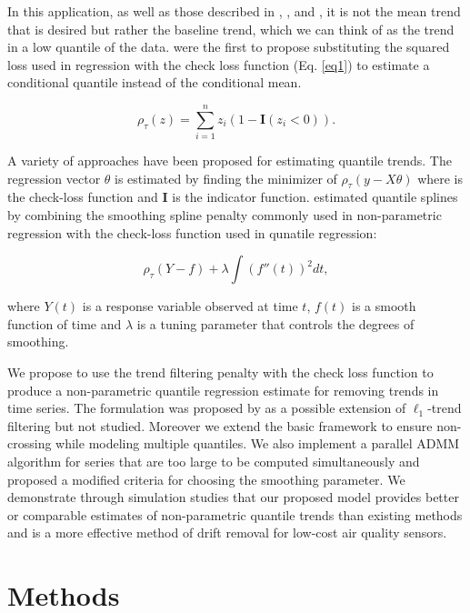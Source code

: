 \documentclass[12pt]{article}
\begin{document}
	
	In this application, as well as those described in \cite{Ning2014}, \cite{marandi2015qualitative}, and \cite{pettersson2013algorithm}, it is not the mean trend that is desired but rather the baseline trend, which we can think of as the trend in a low quantile of the data.  \cite{Koenker1978} were the first to propose substituting the squared loss used in regression with the check loss function  (Eq. \ref{eq1}) to estimate a conditional quantile instead of the conditional mean. 
	
	\begin{equation}
	\label{eq1}
	 \rho_{\tau}(z) = \sum_{i=1}^n z_i(1-\mathbf{I}(z_i<0)).
	\end{equation}
	
	A variety of approaches have been proposed for estimating quantile trends.  The regression vector $\theta$ is estimated by finding the minimizer of $\rho_{\tau}(y-X\theta)$ where is the check-loss function and $\mathbf{I}$ is the indicator function.   \cite{nychka1995nonparametric} estimated quantile splines by combining the smoothing spline penalty commonly used in non-parametric regression with the check-loss function used in qunatile regression:
	
	\begin{equation*}
	\rho_{\tau}(Y - f) + \lambda\int (f''(t))^2 dt, 
 	\end{equation*}
	
	where $Y(t)$ is a response variable observed at time $t$, $f(t)$ is a smooth function of time and $\lambda$ is a tuning parameter that controls the degrees of smoothing. 


	We propose to use the trend filtering penalty with the check loss function to produce a non-parametric quantile regression estimate for removing trends in time series. The formulation was proposed by \cite{Kim2009} as a possible extension of $\ell_1$-trend filtering but not studied. Moreover we extend the basic framework to ensure non-crossing while modeling multiple quantiles. We also implement a parallel ADMM algorithm for series that are too large to be computed simultaneously and proposed a modified criteria for choosing the smoothing parameter. We demonstrate through simulation studies that our proposed model provides better or comparable estimates of non-parametric quantile trends than existing methods and is a more effective method of drift removal for low-cost air quality sensors. 
	

	\section{Methods}
	
\end{document}
